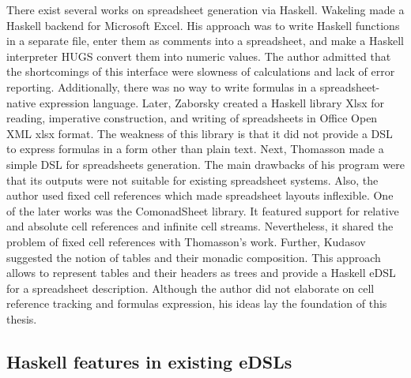 There exist several works on spreadsheet generation via Haskell.
Wakeling \cite{wakeling_spreadsheet_2007} made a Haskell backend for Microsoft Excel. His approach was to write Haskell functions in a separate file, enter them as comments into a spreadsheet, and make a Haskell interpreter HUGS convert them into numeric values. The author admitted that the shortcomings of this interface were slowness of calculations and lack of error reporting. Additionally, there was no way to write formulas in a spreadsheet-native expression language. Later, Zaborsky created a Haskell library Xlsx \cite{github_xlsx} for reading, imperative construction, and writing of spreadsheets in Office Open XML xlsx format. The weakness of this library is that it did not provide a DSL to express formulas in a form other than plain text. Next, Thomasson \cite{github_hcalc} made a simple DSL for spreadsheets generation. The main drawbacks of his program were that its outputs were not suitable for existing spreadsheet systems. Also, the author used fixed cell references which made spreadsheet layouts inflexible. One of the later works was the ComonadSheet \cite{github_comonadsheet} library. It featured support for relative and absolute cell references and infinite cell streams. Nevertheless, it shared the problem of fixed cell references with Thomasson's work. Further, Kudasov \cite{youtube_kudasov} suggested the notion of tables and their monadic composition. This approach allows to represent tables and their headers as trees and provide a Haskell eDSL for a spreadsheet description. Although the author did not elaborate on cell reference tracking and formulas expression, his ideas lay the foundation of this thesis.

\subsection{Haskell features in existing eDSLs}

